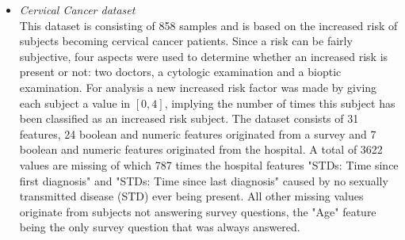 \documentclass[10pt,a4paper]{article}
\begin{document}
\begin{itemize}
		\item \textit{Cervical Cancer dataset} \\ This dataset is consisting of 858 samples and is based on the increased risk of subjects becoming cervical cancer patients. Since a risk can be fairly subjective, four aspects were used to determine whether an increased risk is present or not: two doctors, a cytologic examination and a bioptic examination. For analysis a new increased risk factor was made by giving each subject a value in $[0, 4]$, implying the number of times this subject has been classified as an increased risk subject. The dataset consists of 31 features, 24 boolean and numeric features originated from a survey and 7 boolean and numeric features originated from the hospital. A total of 3622 values are missing of which 787 times the hospital features "STDs: Time since first diagnosis" and "STDs: Time since last diagnosis" caused by no sexually transmitted disease (STD) ever being present. All other missing values originate from subjects not answering survey questions, the "Age" feature being the only survey question that was always answered\cite{fernandes2017transfer}.
	\end{itemize}
	
\end{document}
